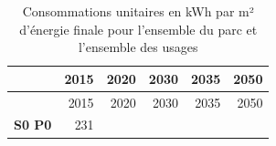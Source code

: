 \documentclass[]{article}
\begin{document}
\begin{longtable}[]{@{}crrrrr@{}}
\caption{Consommations unitaires en kWh par m² d'énergie finale pour
l'ensemble du parc et l'ensemble des usages}\tabularnewline
\toprule
\begin{minipage}[b]{0.20\columnwidth}\centering\strut
~\strut
\end{minipage} & \begin{minipage}[b]{0.08\columnwidth}\raggedleft\strut
2015\strut
\end{minipage} & \begin{minipage}[b]{0.08\columnwidth}\raggedleft\strut
2020\strut
\end{minipage} & \begin{minipage}[b]{0.08\columnwidth}\raggedleft\strut
2030\strut
\end{minipage} & \begin{minipage}[b]{0.08\columnwidth}\raggedleft\strut
2035\strut
\end{minipage} & \begin{minipage}[b]{0.08\columnwidth}\raggedleft\strut
2050\strut
\end{minipage}\tabularnewline
\midrule
\endfirsthead
\toprule
\begin{minipage}[b]{0.20\columnwidth}\centering\strut
~\strut
\end{minipage} & \begin{minipage}[b]{0.08\columnwidth}\raggedleft\strut
2015\strut
\end{minipage} & \begin{minipage}[b]{0.08\columnwidth}\raggedleft\strut
2020\strut
\end{minipage} & \begin{minipage}[b]{0.08\columnwidth}\raggedleft\strut
2030\strut
\end{minipage} & \begin{minipage}[b]{0.08\columnwidth}\raggedleft\strut
2035\strut
\end{minipage} & \begin{minipage}[b]{0.08\columnwidth}\raggedleft\strut
2050\strut
\end{minipage}\tabularnewline
\midrule
\endhead
\begin{minipage}[t]{0.20\columnwidth}\centering\strut
\textbf{S0 P0}\strut
\end{minipage} & \begin{minipage}[t]{0.08\columnwidth}\raggedleft\strut
231\strut
\end{minipage} & \begin{minipage}[t]{0.08\columnwidth}\raggedleft\strut

\end{minipage}
\end{longtable}
\end{document}
